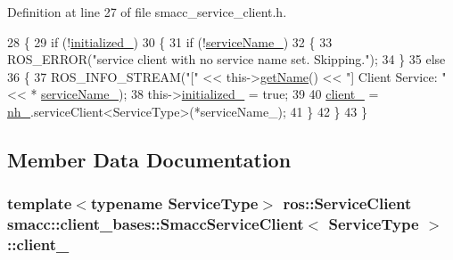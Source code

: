 Definition at line 27 of file smacc\+\_\+service\+\_\+client.\+h.


\begin{DoxyCode}
28     \{
29         \textcolor{keywordflow}{if} (!\hyperlink{classsmacc_1_1client__bases_1_1SmaccServiceClient_ad36816c62fc14380a6d0782a2592a5b4}{initialized\_})
30         \{
31             \textcolor{keywordflow}{if} (!\hyperlink{classsmacc_1_1client__bases_1_1SmaccServiceClient_a63732ec406cb8b6f65bbdbb73e01c7ab}{serviceName\_})
32             \{
33                 ROS\_ERROR(\textcolor{stringliteral}{"service client with no service name set. Skipping."});
34             \}
35             \textcolor{keywordflow}{else}
36             \{
37                 ROS\_INFO\_STREAM(\textcolor{stringliteral}{"["} << this->\hyperlink{classsmacc_1_1ISmaccClient_a20846aabfd1de832aa27d7a8237a1742}{getName}() << \textcolor{stringliteral}{"] Client Service: "} << *
      \hyperlink{classsmacc_1_1client__bases_1_1SmaccServiceClient_a63732ec406cb8b6f65bbdbb73e01c7ab}{serviceName\_});
38                 this->\hyperlink{classsmacc_1_1client__bases_1_1SmaccServiceClient_ad36816c62fc14380a6d0782a2592a5b4}{initialized\_} = \textcolor{keyword}{true};
39 
40                 \hyperlink{classsmacc_1_1client__bases_1_1SmaccServiceClient_a632093eb6bc8b058dec492b21c8536f9}{client\_} = \hyperlink{classsmacc_1_1client__bases_1_1SmaccServiceClient_afb62982383b8269c7962cd1588537489}{nh\_}.serviceClient<ServiceType>(*serviceName\_);
41             \}
42         \}
43     \}
\end{DoxyCode}


\subsection{Member Data Documentation}
\subsubsection[{\texorpdfstring{client\+\_\+}{client_}}]{\setlength{\rightskip}{0pt plus 5cm}template$<$typename Service\+Type$>$ ros\+::\+Service\+Client {\bf smacc\+::client\+\_\+bases\+::\+Smacc\+Service\+Client}$<$ Service\+Type $>$\+::client\+\_\+\hspace{0.3cm}{\ttfamily [protected]}}\hypertarget{classsmacc_1_1client__bases_1_1SmaccServiceClient_a632093eb6bc8b058dec492b21c8536f9}{}\label{classsmacc_1_1client__bases_1_1SmaccServiceClient_a632093eb6bc8b058dec492b21c8536f9}


